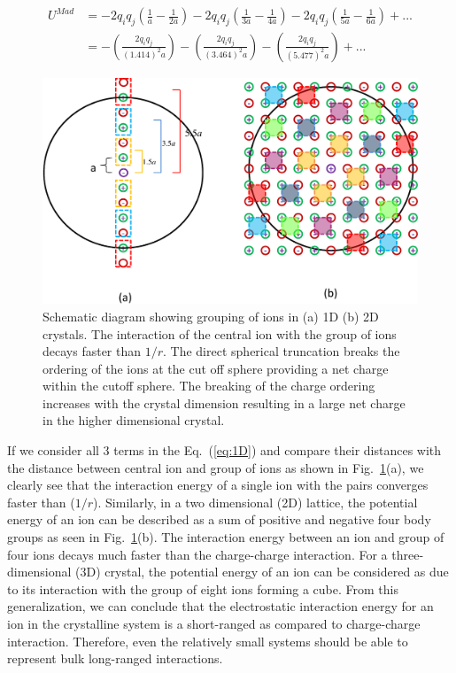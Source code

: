 \begin{equation}
\begin{split}
U^{Mad} & = -2q_iq_j\left(\frac{1}{a}-\frac{1}{2a}\right)-2q_iq_j\left(\frac{1}{3a}-\frac{1}{4a}\right)-2q_iq_j\left(\frac{1}{5a}-\frac{1}{6a}\right) + ... \\
		& = -\left(\frac{ 2q_iq_j}{(1.414)^2a}\right)-\left(\frac{2q_iq_j}{(3.464)^2a}\right)-\left(\frac{2q_iq_j}{(5.477)^2a}\right) +...
\end{split}
\label{eq:1D}
\end{equation} 
 
\begin{figure}
  \centering
  \includegraphics[width=\linewidth]{1D_2DCrystal.pdf}
  \caption{Schematic diagram showing grouping of ions in (a) 1D (b) 2D crystals. The interaction of the central ion with the group of ions decays faster than $1/r$. The direct spherical truncation breaks the ordering of the ions at the cut off sphere providing a net charge within the cutoff sphere. The breaking of the charge ordering increases with the crystal dimension resulting in a large net charge in the higher dimensional crystal.}
   \label{fig:schematic}
\end{figure}

If we consider all 3 terms in the Eq.~(\ref{eq:1D}) and compare their distances with the distance between central ion and group of ions as shown in Fig.~\ref{fig:schematic}(a), we clearly see that the interaction energy of a single ion with the pairs converges faster than ($1/r$). Similarly, in a two dimensional (2D) lattice, the potential energy of an ion can be described as a sum of positive and negative four body groups as seen in Fig.~\ref{fig:schematic}(b). The interaction energy between an ion and group of four ions decays much faster than the charge-charge interaction. For a three-dimensional (3D) crystal, the potential energy of an ion can be considered as due to its interaction with the group of eight ions forming a cube. From this generalization, we can conclude that the electrostatic interaction energy for an ion in the crystalline system is a short-ranged as compared to charge-charge interaction. Therefore, even the relatively small systems should be able to represent bulk long-ranged interactions.


